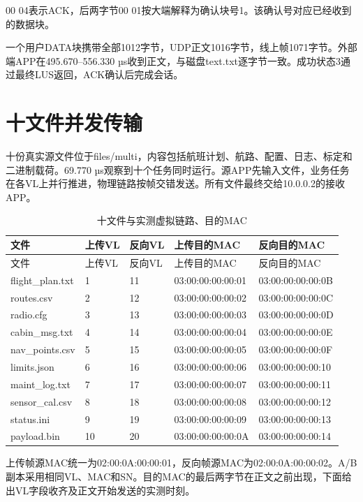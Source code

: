00 04表示ACK，后两字节00 01按大端解释为确认块号1。该确认号对应已经收到的数据块。

一个用户DATA块携带全部1012字节，UDP正文1016字节，线上帧1071字节。外部端APP在495.670--556.330 µs收到正文，与磁盘text.txt逐字节一致。成功状态3通过最终LUS返回，ACK确认后完成会话。

\section{十文件并发传输}

十份真实源文件位于files/multi，内容包括航班计划、航路、配置、日志、标定和二进制载荷。69.770 µs观察到十个任务同时运行。源APP先输入文件，业务任务在各VL上并行推进，物理链路按帧交错发送。所有文件最终交给10.0.0.2的接收APP。

\begingroup\small\setlength{\tabcolsep}{3pt}
\begin{longtable}{@{}P{31mm}P{14mm}P{14mm}P{41mm}P{44mm}@{}}
\caption{十文件与实测虚拟链路、目的MAC}\\\toprule
文件 & 上传VL & 反向VL & 上传目的MAC & 反向目的MAC\\
\midrule\endfirsthead\toprule
文件 & 上传VL & 反向VL & 上传目的MAC & 反向目的MAC\\
\midrule\endhead
flight\_plan.txt & 1 & 11 & 03:00:00:00:00:01 & 03:00:00:00:00:0B\\
routes.csv & 2 & 12 & 03:00:00:00:00:02 & 03:00:00:00:00:0C\\
radio.cfg & 3 & 13 & 03:00:00:00:00:03 & 03:00:00:00:00:0D\\
cabin\_msg.txt & 4 & 14 & 03:00:00:00:00:04 & 03:00:00:00:00:0E\\
nav\_points.csv & 5 & 15 & 03:00:00:00:00:05 & 03:00:00:00:00:0F\\
limits.json & 6 & 16 & 03:00:00:00:00:06 & 03:00:00:00:00:10\\
maint\_log.txt & 7 & 17 & 03:00:00:00:00:07 & 03:00:00:00:00:11\\
sensor\_cal.csv & 8 & 18 & 03:00:00:00:00:08 & 03:00:00:00:00:12\\
status.ini & 9 & 19 & 03:00:00:00:00:09 & 03:00:00:00:00:13\\
payload.bin & 10 & 20 & 03:00:00:00:00:0A & 03:00:00:00:00:14\\
\bottomrule\end{longtable}\endgroup


上传帧源MAC统一为02:00:0A:00:00:01，反向帧源MAC为02:00:0A:00:00:02。A/B副本采用相同VL、MAC和SN。目的MAC的最后两字节在正文之前出现，下面给出VL字段收齐及正文开始发送的实测时刻。

